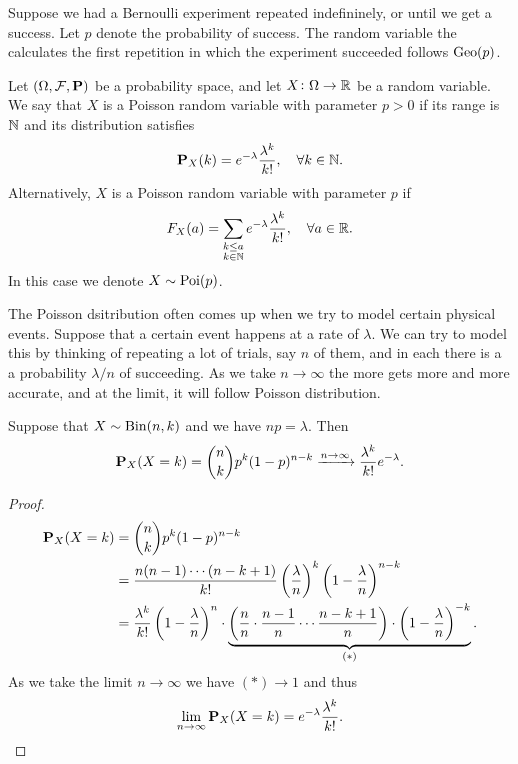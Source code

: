 \documentclass[11pt,a4paper]{article}
\begin{document}
\begin{example}
  Suppose we had a Bernoulli experiment repeated indefininely, or until
  we get a success. Let $p$ denote the probability of success.
  The random variable the calculates the first repetition in which the
  experiment succeeded follows $\operatorname{Geo}(p)$.
\end{example}

\begin{definition}
  Let $(\Omega ,\mathcal F, \mathbf{P})$ be a probability space,
  and let $X \colon \Omega \to \mathbb{R}$ be a random variable.
  We say that $X$ is a Poisson random variable with parameter
  $p > 0$ if its range is $\mathbb{N}$ and its distribution satisfies
  \[
    \mathbf{P}_X(k) = e^{-\lambda} \frac{\lambda^k}{k!}, \quad 
    \forall k \in \mathbb{N}.
  \]
  Alternatively, $X$ is a Poisson random variable with parameter
  $p$ if
  \[
    F_X(a) = \sum_{\substack{k \le a \\ k \in \mathbb{N}}}
    e^{-\lambda} \frac{\lambda^k}{k!}, \quad \forall a \in \mathbb{R}.
  \]
  In this case we denote $X \sim \operatorname{Poi}(p)$.
\end{definition}

\begin{remark}
  The Poisson dsitribution often comes up when we
  try to model certain physical events.
  Suppose that a certain event happens at a rate of $\lambda$.
  We can try to model this by thinking of repeating a lot of trials,
  say $n$ of them, and in each there is a a probability $\lambda / n$ of 
  succeeding.
  As we take $n \to \infty$ the more gets more and more accurate,
  and at the limit, it will follow Poisson distribution.
\end{remark}
 
\begin{theorem}
  \label{thm:poisson-approx}
  Suppose that $X \sim \operatorname{Bin}(n,k)$ and we have
  $np = \lambda$. Then
  \[
    \mathbf{P}_X(X = k) = 
    \binom{n}{k} p^{k} (1-p)^{n-k} \xrightarrow{n\to\infty}
    \frac{\lambda^{k}}{k!} e^{-\lambda}.
  \]
\end{theorem}
\begin{proof}
  \begin{align*}
    \mathbf{P}_X(X = k) &= 
    {\binom{n}{k}}p^{k}(1 - p)^{n - k} \\ &= 
    {\frac{n(n - 1) \cdots (n - k + 1)}{k!}} 
    \left(\frac{\lambda}{n}\right)^k
    \left(1 - {\frac{\lambda}{n}}\right)^{n-k} \\ &= 
    \frac{\lambda^{k}}{k!} \left(1-{\frac{\lambda}{n}}\right)^{n} \cdot
    \underbrace{
    \left( {\frac{n}{n}} \cdot 
    {\frac{n - 1}{n}} \cdots {\frac{n - k + 1}{n}} \right) \cdot 
    \left(1 - {\frac{\lambda}{n}}\right)^{-k}}_{(*)}.
  \end{align*}
  As we take the limit $n \to \infty$ we have $(*) \to 1$ and thus
  \[
    \lim_{n\to\infty}\mathbf{P}_X(X=k)=e^{-\lambda}{\frac{\lambda^{k}}{k!}}.
  \]
\end{proof}
\end{document}
